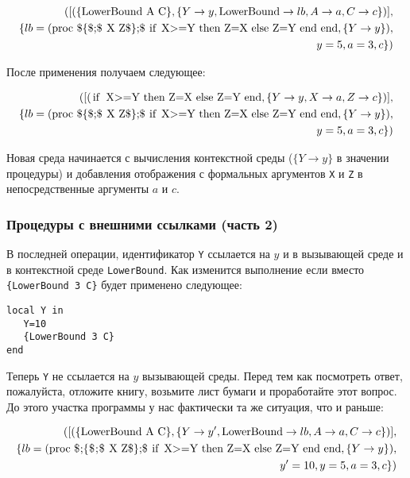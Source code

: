 \begin{eqnarray*}
([(\text{\lstinline|\{LowerBound A C\}|}, \{Y \to y, \text{\lstinline|LowerBound|} \to lb, A \to a, C \to c\})], \\ \{lb = (\text{\lstinline|proc $\{\$\;$ X Z$\}\;$ if X>=Y then Z=X else Z=Y end end|}, \{Y \to y\}), \\ y = 5, a = 3, c\})
\end{eqnarray*}

После применения получаем следующее:

\begin{eqnarray*}
([(\text{\lstinline|if X>=Y then Z=X else Z=Y end|}, \{Y \to y, X \to a, Z \to c\})], \\ \{lb = (\text{\lstinline|proc $\{\$\;$ X Z$\}\;$ if X>=Y then Z=X else Z=Y end end|}, \{Y \to y\}), \\ y = 5, a = 3, c\})
\end{eqnarray*}

Новая среда начинается с вычисления контекстной среды ($\{Y \to y\}$ в значении процедуры) и добавления отображения с формальных аргументов \lstinline|X| и \lstinline|Z| в непосредственные аргументы $a$ и $c$.

\subsubsection{Процедуры с внешними ссылками (часть 2)}

В последней операции, идентификатор \lstinline|Y| ссылается на $y$ и в вызывающей среде и в контекстной среде \lstinline|LowerBound|. Как изменится выполнение если вместо \lstinline|{LowerBound 3 C}| будет применено следующее:

\begin{lstlisting}
local Y in
   Y=10
   {LowerBound 3 C}
end
\end{lstlisting}

Теперь \lstinline|Y| не ссылается на $y$ вызывающей среды. Перед тем как посмотреть ответ, пожалуйста, отложите книгу, возьмите лист бумаги и проработайте этот вопрос. До этого участка программы у нас фактически та же ситуация, что и раньше:

\begin{eqnarray*}
( [(\text{\{\lstinline|LowerBound A C|\}}, \{Y \to y', \text{\lstinline|LowerBound|} \to lb, A \to a, C \to c\})], \\
\{ lb = (\text{\lstinline|proc $\;\{\$\;$ X Z$\}\;$ if X>=Y then Z=X else Z=Y end end|}, \{Y \to y\}), \\
y' = 10, y = 5, a = 3, c\} )
\end{eqnarray*}

